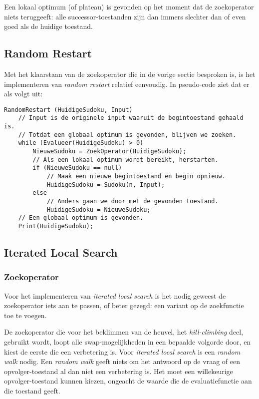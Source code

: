 \documentclass[]{report}
\begin{document}
Een lokaal optimum (of plateau) is gevonden op het moment dat de zoekoperator niets teruggeeft: alle successor-toestanden zijn dan immers slechter dan of even goed als de huidige toestand.

\subsection{Random Restart}
Met het klaarstaan van de zoekoperator die in de vorige sectie besproken is, is het implementeren van \textit{random restart} relatief eenvoudig. In pseudo-code ziet dat er als volgt uit:

\begin{minipage}{\textwidth}
\begin{lstlisting}
RandomRestart (HuidigeSudoku, Input)
	// Input is de originele input waaruit de begintoestand gehaald is.
	// Totdat een globaal optimum is gevonden, blijven we zoeken.
	while (Evalueer(HuidigeSudoku) > 0)
		NieuweSudoku = ZoekOperator(HuidigeSudoku);
		// Als een lokaal optimum wordt bereikt, herstarten.
		if (NieuweSudoku == null)
			// Maak een nieuwe begintoestand en begin opnieuw.
			HuidigeSudoku = Sudoku(n, Input);
		else
			// Anders gaan we door met de gevonden toestand. 
			HuidigeSudoku = NieuweSudoku;
	// Een globaal optimum is gevonden.
	Print(HuidigeSudoku);
\end{lstlisting}
\end{minipage}

\subsection{Iterated Local Search}
\subsubsection{Zoekoperator}
Voor het implementeren van \textit{iterated local search} is het nodig geweest de zoekoperator iets aan te passen, of beter gezegd: een variant op de zoekfunctie toe te voegen. 

De zoekoperator die voor het beklimmen van de heuvel, het \textit{hill-climbing} deel, gebruikt wordt, loopt alle swap-mogelijkheden in een bepaalde volgorde door, en kiest de eerste die een verbetering is. Voor \textit{iterated local search} is een \textit{random walk} nodig. Een \textit{random walk} geeft niets om het antwoord op de vraag of een opvolger-toestand al dan niet een verbetering is. Het moet een willekeurige opvolger-toestand kunnen kiezen, ongeacht de waarde die de evaluatiefunctie aan die toestand geeft. 
\end{document}
